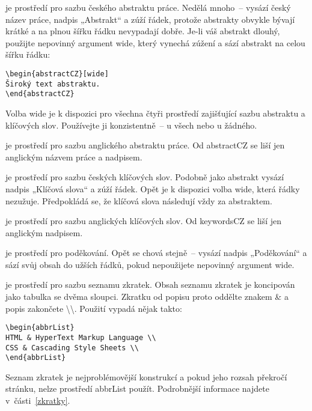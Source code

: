 \documentclass[FF,fonts]{tulthesis}
\newcommand{\argument}[1]{{\ttfamily\color{\tulcolor}#1}}
\newcommand{\argumentindex}[1]{\argument{#1}\index{#1}}
\newcommand{\prostredi}[1]{\argumentindex{#1}}
\newenvironment{myquote}{\begin{list}{}{\setlength\leftmargin\parindent}\item[]}{\end{list}}
\newenvironment{listing}{\begin{myquote}\color{\tulcolor}}{\end{myquote}}
\begin{document}
\begin{description}
\item[\prostredi{abstractCZ}] je prostředí pro sazbu českého abstraktu práce.
Nedělá mnoho~-- vysází český název práce, nadpis „Abstrakt“ a zúží řádek,
protože abstrakty obvykle bývají krátké a na plnou šířku řádku nevypadají
dobře. Je-li váš abstrakt dlouhý, použijte nepovinný argument \argument{wide},
který vynechá zúžení a sází abstrakt na celou šířku řádku:

\begin{listing}
\begin{verbatim}
\begin{abstractCZ}[wide]
Široký text abstraktu.
\end{abstractCZ}
\end{verbatim}
\end{listing}

Volba \argument{wide} je k dispozici pro všechna čtyři prostředí zajišťující
sazbu abstraktu a klíčových slov. Používejte ji konzistentně~-- u všech nebo u
žádného.

\item[\prostredi{abstractEN}] je prostředí pro sazbu anglického abstraktu práce.
Od \argument{abstractCZ} se liší jen anglickým názvem práce a nadpisem.

\item[\prostredi{keywordsCZ}] je prostředí pro sazbu českých klíčových slov.
Podobně jako abstrakt vysází nadpis „Klíčová slova“ a zúží řádek. Opět je k
dispozici volba \argument{wide}, která řádky nezužuje. Předpokládá se, že
klíčová slova následují vždy za abstraktem.

\item[\prostredi{keywordsEN}] je prostředí pro sazbu anglických klíčových slov.
Od \argument{keywordsCZ} se liší jen anglickým nadpisem.

\item[\prostredi{acknowledgement}] je prostředí pro poděkování. Opět se chová
stejně~-- vysází nadpis „Poděkování“ a sází svůj obsah do užších řádků, pokud
nepoužijete nepovinný argument \argument{wide}.

\item[\prostredi{abbrList}] je prostředí pro sazbu seznamu zkratek. Obsah
seznamu zkratek je koncipován jako tabulka se dvěma sloupci. Zkratku od popisu
proto oddělte znakem \argument{\&} a popis zakončete
\argument{\textbackslash\textbackslash}. Použití vypadá nějak takto:

{\color{\tulcolor}
\begin{verbatim}
\begin{abbrList}
HTML & HyperText Markup Language \\
CSS & Cascading Style Sheets \\
\end{abbrList}
\end{verbatim}}

Seznam zkratek je nejproblémovější konstrukcí a pokud jeho rozsah překročí
stránku, nelze prostředí \argument{abbrList} použít. Podrobnější informace
najdete v~části~\ref{zkratky}.

\end{description}
\end{document}
